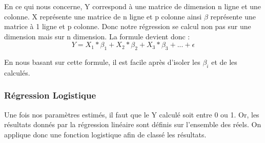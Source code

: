 En ce qui nous concerne, Y correspond à une matrice de dimension n ligne et une colonne. X représente une matrice de n ligne et p colonne ainsi $\beta$ représente une matrice à 1 ligne et p colonne. 
Donc notre régression se calcul non pas sur une dimension mais sur n dimension. La formule devient donc :
\begin{equation}
Y = X_{1} * \beta_{1} +X_{2} * \beta_{2} + X_{3} * \beta_{3} + ... + \epsilon
\end{equation}


En nous basant sur cette formule, il est facile après d'isoler les $\beta_{i}$ et de les calculés. 


\subsubsection{Régression Logistique}

Une fois nos paramètres estimés, il faut que le Y calculé soit entre 0 ou 1. Or, les résultats donnés par la régression linéaire sont définis sur l'ensemble des réels. On applique donc une fonction logistique afin de classé les résultats. 


